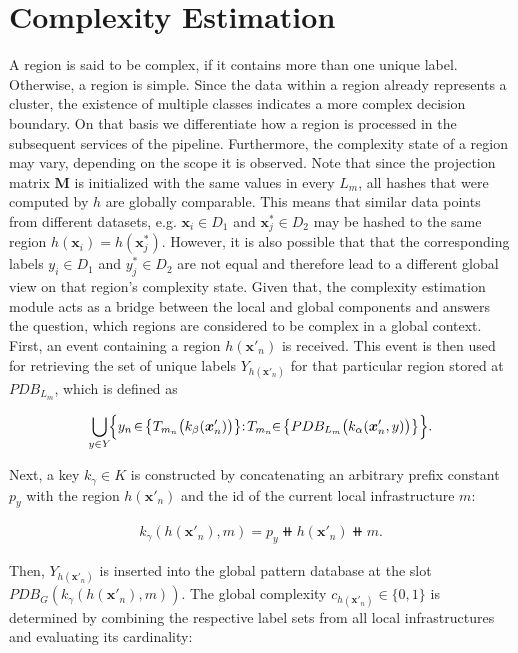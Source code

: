 \section{Complexity Estimation} \label{sec:complexity_estimation}

A region is said to be complex, if it contains more than one unique label. Otherwise, a region is simple. Since the data within a region already represents a cluster, the existence of multiple classes indicates a more complex decision boundary. On that basis we differentiate how a region is processed in the subsequent services of the pipeline. Furthermore, the complexity state of a region may vary, depending on the scope it is observed. Note that since the projection matrix $\bm{M}$ is initialized with the same values in every $L_m$, all hashes that were computed by $h$ are globally comparable. This means that similar data points from different datasets, e.g. $\bm{x}_i \in D_1$ and $\bm{x}_j^* \in D_2$ may be hashed to the same region $h(\bm{x}_i) = h(\bm{x}^*_j)$. However, it is also possible that that the corresponding labels $y_i \in D_1$ and $y^*_j \in D_2$ are not equal and therefore lead to a different global view on that region's complexity state. Given that, the complexity estimation module acts as a bridge between the local and global components and answers the question, which regions are considered to be complex in a global context. First, an event containing a region $h(\bm{x}'_n)$ is received. This event is then used for retrieving the set of unique labels $Y_{h(\bm{x}'_n)}$ for that particular region stored at $PDB_{L_m}$, which is defined as

 \begin{align*}
    \bigcup_{y \in Y} \! \Bigl\{ y_n \! \in \! \bigl\{T_{m_n}\bigl(k_\beta(\bm{x}'_n)\bigl)\bigl\} : \! T_{m_n} \! \! \in \! \bigl\{PDB_{L_m}\bigl(k_\alpha(\bm{x}'_n, y) \bigl)\bigl\}\Bigl\}.
 \end{align*}

 Next, a key $k_\gamma \in K$ is constructed by concatenating an arbitrary prefix constant $p_y$ with the region $h(\bm{x}'_n)$ and the id of the current local infrastructure $m$:

\begin{align*}
    k_\gamma(h(\bm{x}'_n), m) = p_y \doubleplus h(\bm{x}'_n) \doubleplus m.
\end{align*}

 Then, $Y_{h(\bm{x}'_n)}$ is inserted into the global pattern database at the slot $PDB_G(k_\gamma(h(\bm{x}'_n), m))$. The global complexity $c_{h(\bm{x}'_n)} \in \{0, 1\}$ is determined by combining the respective label sets from all local infrastructures and evaluating its cardinality:
 

